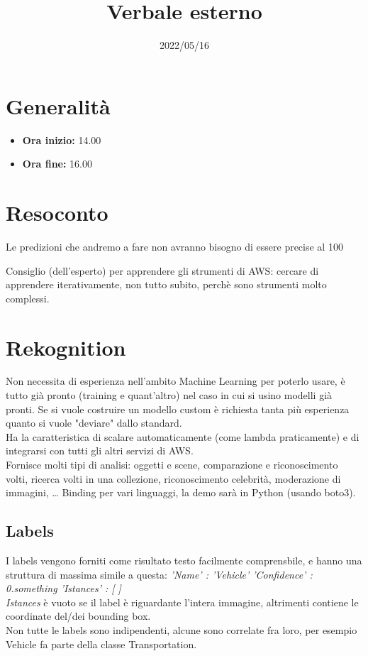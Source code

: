 \documentclass{classes/base}
\title{Verbale esterno}
\date{2022/05/16}
\author{\marcob}
\renewcommand{\maketitle}{
    
}
\begin{document}
    \maketitle

    \section*{Generalità}
    \begin{itemize}
        \item \textbf{Ora inizio:} 14.00
        \item \textbf{Ora fine:} 16.00
    \end{itemize}

    \section*{Resoconto}

    Le predizioni che andremo a fare non avranno bisogno di essere precise al 100%

    Consiglio (dell’esperto) per apprendere gli strumenti di AWS: cercare di apprendere iterativamente, non tutto subito, perchè sono strumenti molto complessi.\\

    \section*{Rekognition}
    Non necessita di esperienza nell’ambito Machine Learning per poterlo usare, è tutto già pronto (training e quant’altro) nel caso in cui si usino modelli già pronti.
    Se si vuole costruire un modello custom è richiesta tanta più esperienza quanto si vuole "deviare" dallo standard.\\
    Ha la caratteristica di scalare automaticamente (come lambda praticamente) e di integrarsi con tutti gli altri servizi di AWS.\\
    Fornisce molti tipi di analisi: oggetti e scene, comparazione e riconoscimento volti, ricerca volti in una collezione, riconoscimento celebrità, moderazione di immagini, …
    Binding per vari linguaggi, la demo sarà in Python (usando boto3).


    \subsection*{Labels}
    I labels vengono forniti come risultato testo facilmente comprensbile, e hanno una struttura di massima simile a questa:
    \textit{'Name' : 'Vehicle' 
    'Confidence' : 0.something 
    'Istances' : [ ]}  
    \\
    \textit{Istances} è vuoto se il label è
                        riguardante l'intera immagine, altrimenti 
                        contiene le coordinate del/dei bounding box.\\
    Non tutte le labels sono indipendenti, alcune sono correlate fra loro, per esempio Vehicle fa parte della classe Transportation.
\end{document}
